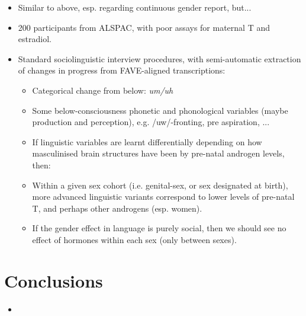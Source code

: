 \documentclass[a0,portrait]{a0poster}
\begin{document}
\begin{multicols}{2}
\begin{itemize}
	\item Similar to above, esp. regarding continuous gender report, but...
	\item 200 participants from ALSPAC, with poor assays for maternal T and estradiol. 
	\item Standard sociolinguistic interview procedures, with semi-automatic extraction of changes in progress from FAVE-aligned transcriptions:
	\begin{itemize}
		\item Categorical change from below: \textsl{um/uh}
		\item Some below-consciousness phonetic and phonological variables (maybe production and perception), e.g. /uw/-fronting, pre aspiration, ...
	\end{itemize}
	\begin{center}
\begin{itemize}
\item If linguistic variables are learnt differentially depending on how masculinised brain structures have been by pre-natal androgen levels, then:
\end{itemize}
\end{center} 
\begin{itemize}
	\item Within a given sex cohort (i.e. genital-sex, or sex designated at birth), more advanced linguistic variants correspond to lower levels of pre-natal T, and perhaps other androgens (esp. women).
	\item If the gender effect in language is purely social, then we should see no effect of hormones within each sex (only between sexes).
\end{itemize}
\end{itemize}


\color{SaddleBrown} %

\section*{Conclusions}

\begin{itemize}
\item 
\end{itemize}


\end{multicols}
\end{document}
